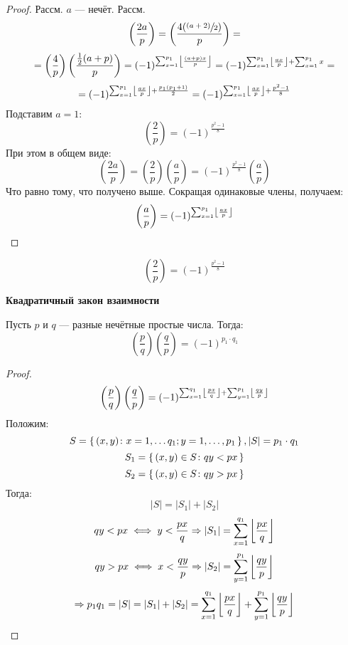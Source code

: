 \begin{proof}
Рассм. $a$ --- нечёт. Рассм.
\[
  \left(\frac{2a}{p}\right) = \left(\frac{4(\sfrac{(a + 2)}{2})}{p}\right) = 
\]
\[
  = \left(\frac{4}{p}\right)\left(\frac{\frac{1}{2}(a + p)}{p}\right) = (-1)^{\sum_{x = 1}^{p_1} \left\lfloor \frac{(a + p)x}{p} \right\rfloor} = (-1)^{\sum_{x = 1}^{p_1} \left\lfloor \frac{ax}{p} \right\rfloor + \sum_{x = 1}^{p_1} x} = 
\]
\[
 = (-1)^{\sum_{x = 1}^{p_1} \left\lfloor \frac{ax}{p} \right\rfloor + \frac{p_1(p_1 + 1)}{2}} = (-1)^{\sum_{x = 1}^{p_1} \left\lfloor \frac{ax}{p} \right\rfloor + \frac{p ^{2} - 1}{8}}
\]
Подставим $a = 1$:
\[
  \left(\frac{2}{p}\right) = (-1)^{\frac{p ^{2} - 1}{8}}
\]
При этом в общем виде:
\[
  \left(\frac{2a}{p}\right) = \left(\frac{2}{p}\right) \left(\frac{a}{p}\right) = (-1)^{\frac{p ^{2} - 1}{8}}\left(\frac{a}{p}\right)
\]
Что равно тому, что получено выше. Сокращая одинаковые члены, получаем:
\[
  \left(\frac{a}{p}\right) = (-1)^{\sum_{x = 1}^{p_1} \left\lfloor \frac{ax}{p} \right\rfloor}
\]
\end{proof}
\begin{consequence}
  \label{cs:01_5}
  \[
    \left(\frac{2}{p}\right) = (-1)^{\frac{p ^{2} - 1}{8}}
  \]
\end{consequence}
\textbf{Квадратичный закон взаимности}

Пусть $p$ и $q$ --- разные нечётные простые числа. Тогда:
\begin{equation}
  \label{eq:quadratic_law}
\left(\frac{p}{q}\right)\left(\frac{q}{p}\right) = (-1)^{p_1 \cdot q_1}
\end{equation}
\begin{proof}
\[
\left(\frac{p}{q}\right)\left(\frac{q}{p}\right) = (-1)^{\sum_{x = 1}^{q_1} \left\lfloor \frac{px}{q} \right\rfloor + \sum_{y = 1}^{p_1} \left\lfloor \frac{qy}{p} \right\rfloor}
\]
Положим:
\[
S = \set{(x, y)\colon x = 1,\ldots q_1; y = 1, \ldots, p_1}, \left|S\right| = p_1 \cdot q_1
\]
\[
S_1 = \set{(x, y) \in S \colon qy < px}
\]
\[
S_2 = \set{(x, y) \in S \colon qy > px}
\]
Тогда:
\[
\left|S\right| = \left|S_1\right| + \left|S_2\right|
\]
\[
qy < px \iff y < \frac{px}{q} \Rightarrow \left|S_1\right| = \sum_{x = 1}^{q_1} \left\lfloor \frac{px}{q} \right\rfloor
\]
\[
qy > px \iff x < \frac{qy}{p} \Rightarrow \left|S_2\right| = \sum_{y = 1}^{p_1} \left\lfloor \frac{qy}{p} \right\rfloor
\]
\[
\Rightarrow p_1q_1 = \left|S\right| = \left|S_1\right| + \left|S_2\right| = \sum_{x = 1}^{q_1} \left\lfloor \frac{px}{q} \right\rfloor + \sum_{y = 1}^{p_1} \left\lfloor \frac{qy}{p} \right\rfloor
\]
\end{proof}
